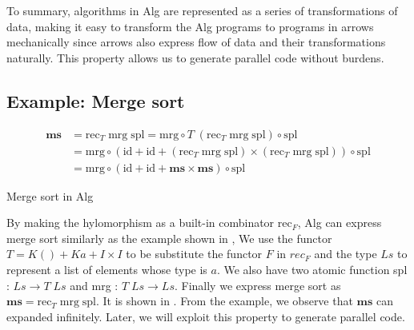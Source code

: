To summary, algorithms in Alg are represented as a series of transformations of data, making it easy to transform the Alg programs to programs in arrows mechanically since arrows also express flow of data and their transformations naturally. This property allows us to generate parallel code without burdens.

\subsection{Example: Merge sort}
\begin{listing}[ht]
\begin{align*}
\mathbf{ms} &= \text{rec}_T \; \text{mrg} \; \text{spl} = \text{mrg} \circ T \; (\text{rec}_T \; \text{mrg} \; \text{spl}) \circ \text{spl} \\
& = \text{mrg} \circ (\text{id} + \text{id} + (\text{rec}_T \; \text{mrg} \; \text{spl}) \times (\text{rec}_T \; \text{mrg} \; \text{spl})) \circ \text{spl} \\
& = \text{mrg}  \circ (\text{id} + \text{id} + \mathbf{ms} \times \mathbf{ms}) \circ \text{spl}
\end{align*}
\caption{Merge sort in Alg} \label{p:pal:c5}
\end{listing}

By making the hylomorphism as a built-in combinator $\text{rec}_F$, Alg can express merge sort similarly as the example shown in , We use the functor $T = K () + K a + I \times I $ to be substitute the functor $F$ in $rec_F$ and the type $Ls$ to represent a list of elements whose type is $a$. We also have two atomic function spl : $Ls \rightarrow T \; Ls$ and mrg : $T \; Ls \rightarrow Ls$. Finally we express merge sort as $\mathbf{ms} = \text{rec}_T \; \text{mrg} \; \text{spl}$. It is shown in . From the example, we observe that $\mathbf{ms}$ can expanded infinitely. Later, we will exploit this property to generate parallel code. 

